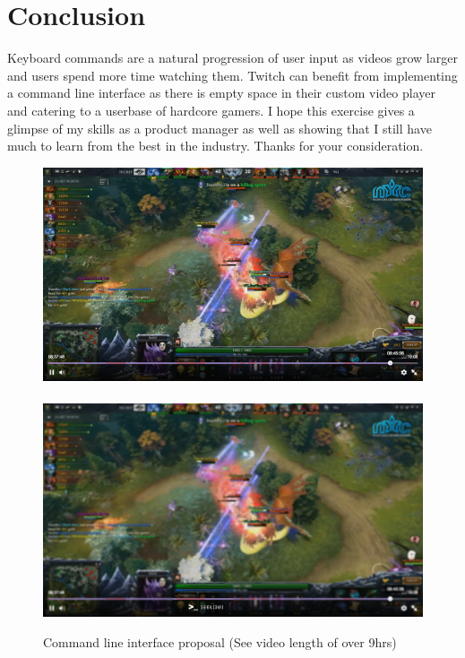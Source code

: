 \documentclass[11pt, letterpaper, UTF-8]{article}
\begin{document}
\section{Conclusion}
Keyboard commands are a natural progression of user input as videos grow larger and users spend more time watching them. Twitch can benefit from implementing a command line interface as there is empty space in their custom video player and catering to a userbase of hardcore gamers. I hope this exercise gives a glimpse of my skills as a product manager as well as showing that I still have much to learn from the best in the industry. Thanks for your consideration. \\

\newpage
\begin{figure}[p]
\includegraphics[width=1\textwidth]{twitchnoblur}
\\\smallskip\\
\includegraphics[width=1\textwidth]{twitch}
\caption{Command line interface proposal (See video length of over 9hrs)}
\end{figure}
\end{document}
